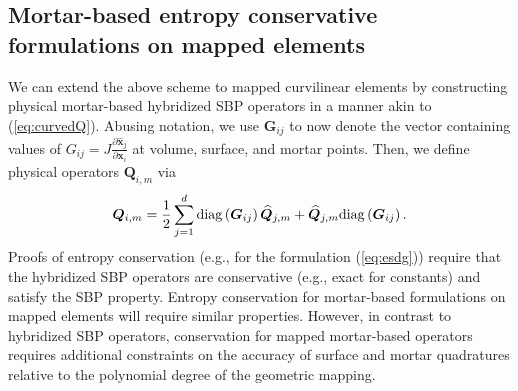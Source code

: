 \documentclass{svjour3}                     %
\renewcommand{\hat}{\widehat}
\renewcommand{\tilde}{\widetilde}
\newcommand{\diag}[1]{{\rm diag}\LRp{#1}}
\newcommand{\td}[2]{\frac{{\rm d}#1}{{\rm d}{\rm #2}}}
\newcommand{\pd}[2]{\frac{\partial#1}{\partial#2}}
\newcommand{\LRp}[1]{\left( #1 \right)}
\renewcommand{\note}[1]{{\color{blue}{#1}}}
\begin{document}
%


\subsection{Mortar-based entropy conservative formulations on mapped elements}

We can extend the above scheme to mapped curvilinear elements by constructing physical mortar-based hybridized SBP operators in a manner akin to (\ref{eq:curvedQ}).  Abusing notation, we use $\bm{G}_{ij}$ to now denote the vector containing values of $G_{ij} = J\pd{\hat{\bm{x}}_j}{\bm{x}_i}$ at volume, surface, and mortar points.  Then, we define physical operators $\bm{Q}_{i,m}$ via
\begin{equation}
\bm{Q}_{i,m} = \frac{1}{2}\sum_{j=1}^d \diag{\bm{G}_{ij}}\hat{\bm{Q}}_{j,m} + \hat{\bm{Q}}_{j,m} \diag{\bm{G}_{ij}}.
\label{eq:curvedQ_mortar}
\end{equation}
Proofs of entropy conservation (e.g., for the formulation (\ref{eq:esdg})) require that the hybridized SBP operators are conservative (e.g., exact for constants) and satisfy the SBP property.  Entropy conservation for mortar-based formulations on mapped elements will require similar properties.  However, in contrast to hybridized SBP operators, conservation for mapped mortar-based operators requires additional constraints on the accuracy of surface and mortar quadratures relative to the polynomial degree of the geometric mapping.  
\end{document}
